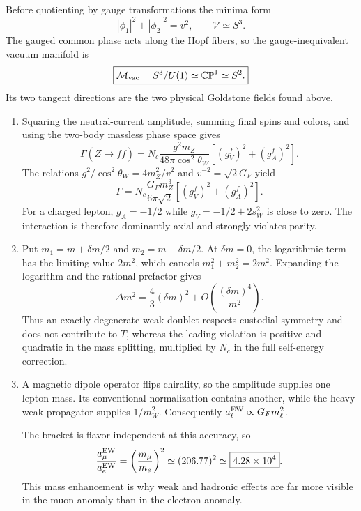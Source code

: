 \begin{enumerate}
\begin{enumerate}
    Before quotienting by gauge transformations the minima form
    \[
      |\phi_1|^2+|\phi_2|^2=v^2,\qquad \mathcal V\simeq S^3.
    \]
    The gauged common phase acts along the Hopf fibers, so the
    gauge-inequivalent vacuum manifold is
    \[
      \boxed{\mathcal M_{\rm vac}
        =S^3/U(1)\simeq\mathbb{CP}^1\simeq S^2.}
    \]
    Its two tangent directions are the two physical Goldstone fields
    found above.
  \end{enumerate}

  \begin{enumerate}
    \item[(a)]
    Squaring the neutral-current amplitude, summing final spins and colors,
    and using the two-body massless phase space gives
    \[
      \Gamma(Z\to f\bar f)
        =N_c\frac{g^2m_Z}{48\pi\cos^2\theta_W}
         [(g_V^f)^2+(g_A^f)^2].
    \]
    The relations
    \(g^2/\cos^2\theta_W=4m_Z^2/v^2\) and
    \(v^{-2}=\sqrt2G_F\) yield
    \[
      \boxed{\Gamma
        =N_c\frac{G_Fm_Z^3}{6\pi\sqrt2}
         [(g_V^f)^2+(g_A^f)^2].}
    \]
    For a charged lepton,
    \(g_A=-1/2\) while \(g_V=-1/2+2s_W^2\) is close to zero.
    The interaction is therefore dominantly axial and strongly violates
    parity.
    \item[(b)]
    Put \(m_1=m+\delta m/2\) and \(m_2=m-\delta m/2\).  At
    \(\delta m=0\), the logarithmic term has the limiting value
    \(2m^2\), which cancels \(m_1^2+m_2^2=2m^2\).  Expanding the logarithm
    and the rational prefactor gives
    \[
      \boxed{\Delta m^2
        =\frac43(\delta m)^2
         +O\!\left(\frac{(\delta m)^4}{m^2}\right).}
    \]
    Thus an exactly degenerate weak doublet respects custodial symmetry
    and does not contribute to \(T\), whereas the leading violation is
    positive and quadratic in the mass splitting, multiplied by \(N_c\)
    in the full self-energy correction.
    \item[(c)]
    A magnetic dipole operator flips chirality, so the amplitude supplies
    one lepton mass.  Its conventional normalization contains another,
    while the heavy weak propagator supplies \(1/m_W^2\).  Consequently
    \(a_\ell^{\rm EW}\propto G_Fm_\ell^2\).

    The bracket is flavor-independent at this accuracy, so
    \[
      \frac{a_\mu^{\rm EW}}{a_e^{\rm EW}}
        =\left(\frac{m_\mu}{m_e}\right)^2
        \simeq(206.77)^2
        \simeq\boxed{4.28\times10^4}.
    \]
    This mass enhancement is why weak and hadronic effects are far more
    visible in the muon anomaly than in the electron anomaly.
  \end{enumerate}


\end{enumerate}
